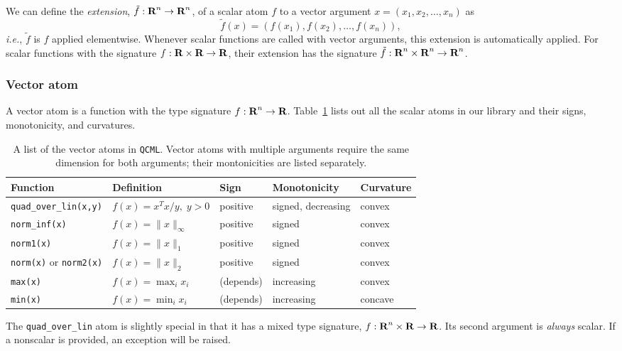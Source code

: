\documentclass[11pt]{article}
\def\qcml{\texttt{QCML}\xspace}
\newcommand{\ie}{{\it i.e.}}
\newcommand{\reals}{{\mbox{\bf R}}}
\begin{document}
We can define the \emph{extension}, $\tilde f : \reals^n \to \reals^n$, 
of a scalar atom $f$ to a vector argument $x = (x_1, x_2, \ldots, x_n)$ as
\[
\tilde f(x) = \left( f(x_1), f(x_2), \ldots, f(x_n) \right),
\]
\ie, $\tilde f$ is $f$ applied elementwise.
Whenever scalar functions are called with vector arguments, this extension
is automatically applied. For scalar functions with the signature 
$f : \reals \times \reals \to \reals$, their extension has the signature
$\tilde f : \reals^n \times \reals^n \to \reals^n$.

\subsubsection{Vector atom}
A vector atom is a function with the type signature $f : \reals^n \to \reals$.
Table~\ref{t-vector-atoms} lists out all the scalar atoms in our library
and their signs, monotonicity, and curvatures.

\begin{table}
  \centering
  \small
  \renewcommand{\arraystretch}{1.5}
  \centering
\begin{tabular}{|l|l||l|l|l|} \hline
  Function & Definition & Sign & Monotonicity & Curvature \\ \hline
  {\tt quad\_over\_lin(x,y)} & $f(x) = x^Tx/y, \; y >0$ & positive & signed, decreasing & convex \\ \hline
  {\tt norm\_inf(x)} & $f(x) = \|x\|_\infty$ & positive & signed & convex \\ \hline
  {\tt norm1(x)} & $f(x) = \|x\|_1$ & positive & signed & convex \\ \hline
  {\tt norm(x)} or {\tt norm2(x)} & $f(x) = \|x\|_2$ & positive & signed & convex \\ \hline
  {\tt max(x)} & $f(x) = \max_i x_i$ & (depends) & increasing & convex \\ \hline
  {\tt min(x)} & $f(x) = \min_i x_i$ & (depends) & increasing & concave \\ \hline
\end{tabular}
\caption{A list of the vector atoms in \qcml. Vector atoms with multiple arguments
require the same dimension for both arguments; their montonicities are listed separately.}
\label{t-vector-atoms}
\end{table}

The {\tt quad\_over\_lin} atom is slightly special in that it has a mixed
type signature, $f : \reals^n \times \reals \to \reals$. Its second argument
is \emph{always} scalar. If a nonscalar is provided, an exception will be
raised.
\end{document}
